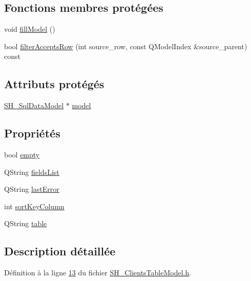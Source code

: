 \subsection*{Fonctions membres protégées}
\begin{DoxyCompactItemize}
\item 
void \hyperlink{classSH__ClientsTableModel_acdce7cce4737b66016078011cffdaa31}{fill\-Model} ()
\item 
bool \hyperlink{classSH__ExtendedProxyModel_a1eda169699702a7bfed4dfa8718c0b86}{filter\-Accepts\-Row} (int source\-\_\-row, const Q\-Model\-Index \&source\-\_\-parent) const 
\end{DoxyCompactItemize}
\subsection*{Attributs protégés}
\begin{DoxyCompactItemize}
\item 
\hyperlink{classSH__SqlDataModel}{S\-H\-\_\-\-Sql\-Data\-Model} $\ast$ \hyperlink{classSH__ExtendedProxyModel_a8c8b8930c6b1abd9bbb1dce1fdc9690b}{model}
\end{DoxyCompactItemize}
\subsection*{Propriétés}
\begin{DoxyCompactItemize}
\item 
bool \hyperlink{classSH__ExtendedProxyModel_a9e22d17af7776aca8052084cc33c3442}{empty}
\item 
Q\-String \hyperlink{classSH__ExtendedProxyModel_a15e779ba92384a57442d6bd79ef3d1d1}{fields\-List}
\item 
Q\-String \hyperlink{classSH__ExtendedProxyModel_a287d34971582bbe68a7f1f0826165de5}{last\-Error}
\item 
int \hyperlink{classSH__ExtendedProxyModel_a47e2d0b99b84fb066438db667dd1ad26}{sort\-Key\-Column}
\item 
Q\-String \hyperlink{classSH__ExtendedProxyModel_a7eef4557a77444e9ce5c24c180392bfa}{table}
\end{DoxyCompactItemize}


\subsection{Description détaillée}


Définition à la ligne \hyperlink{SH__ClientsTableModel_8h_source_l00013}{13} du fichier \hyperlink{SH__ClientsTableModel_8h_source}{S\-H\-\_\-\-Clients\-Table\-Model.\-h}.



